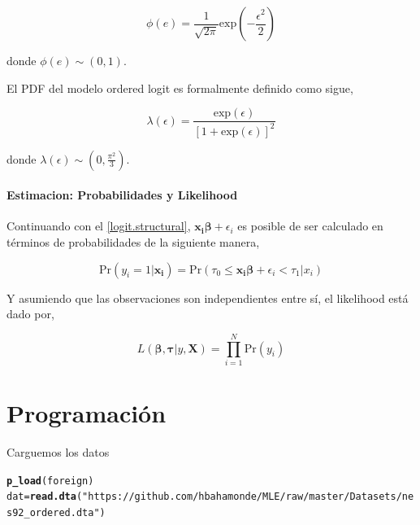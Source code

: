 \documentclass[onesided]{article}\usepackage[]{graphicx}\usepackage[]{color}
\makeatletter
\newcommand{\hlstr}[1]{\textcolor[rgb]{0.192,0.494,0.8}{#1}}%
\newcommand{\hlstd}[1]{\textcolor[rgb]{0.345,0.345,0.345}{#1}}%
\newcommand{\hlkwb}[1]{\textcolor[rgb]{0.69,0.353,0.396}{#1}}%
\newcommand{\hlkwd}[1]{\textcolor[rgb]{0.737,0.353,0.396}{\textbf{#1}}}%
\newenvironment{kframe}{%
 \def\at@end@of@kframe{}%
 \ifinner\ifhmode%
  \def\at@end@of@kframe{\end{minipage}}%
  \begin{minipage}{\columnwidth}%
 \fi\fi%
 \def\FrameCommand##1{\hskip\@totalleftmargin \hskip-\fboxsep
 \colorbox{shadecolor}{##1}\hskip-\fboxsep
     \hskip-\linewidth \hskip-\@totalleftmargin \hskip\columnwidth}%
 \MakeFramed {\advance\hsize-\width
   \@totalleftmargin\z@ \linewidth\hsize
   \@setminipage}}%
 {\par\unskip\endMakeFramed%
 \at@end@of@kframe}
\newenvironment{knitrout}{}{} %
\makeatother
\begin{document}
\begin{equation}%
\phi(e) = \frac{1}{\sqrt{2\pi}}\text{exp}(-\frac{\epsilon^{2}}{2})
\end{equation}

donde $\phi(e) \sim (0,1)$.

El PDF del modelo ordered logit es formalmente definido como sigue,

\begin{equation}%
\lambda(\epsilon) = \frac{\text{exp}(\epsilon)}{[1+\text{exp}(\epsilon)]^{2}}
\end{equation}

donde $\lambda(\epsilon)\sim(0, \frac{\pi^{2}}{3})$.

\paragraph{Estimacion: Probabilidades y Likelihood} Continuando con el \autoref{logit.structural}, $\boldsymbol{x_{i}}\boldsymbol{\beta} + \epsilon_{i}$ es posible de ser calculado en t\'erminos de probabilidades de la siguiente manera,


\begin{equation}%
\text{Pr}(y_{i}=1|\boldsymbol{x_{i}}) = \text{Pr}(\tau_{0} \leq \boldsymbol{x_{i}}\boldsymbol{\beta} + \epsilon_{i} < \tau_{1}|x_{i})
\end{equation}

Y asumiendo que las observaciones son independientes entre s\'i, el likelihood est\'a dado por,

\begin{equation}%
L(\boldsymbol{\beta},\boldsymbol{\tau}|y, \boldsymbol{X}) = \prod_{i=1}^{N}\text{Pr}(y_{i})
\end{equation}

\section{Programaci\'on}

Carguemos los datos
\begin{knitrout}
\color{fgcolor}\begin{kframe}
\begin{alltt}
\hlkwd{p_load}\hlstd{(foreign)}
\hlstd{dat} \hlkwb{=} \hlkwd{read.dta}\hlstd{(}\hlstr{"https://github.com/hbahamonde/MLE/raw/master/Datasets/nes92_ordered.dta"}\hlstd{)}
\end{alltt}
\end{kframe}
\end{knitrout}
\end{document}
